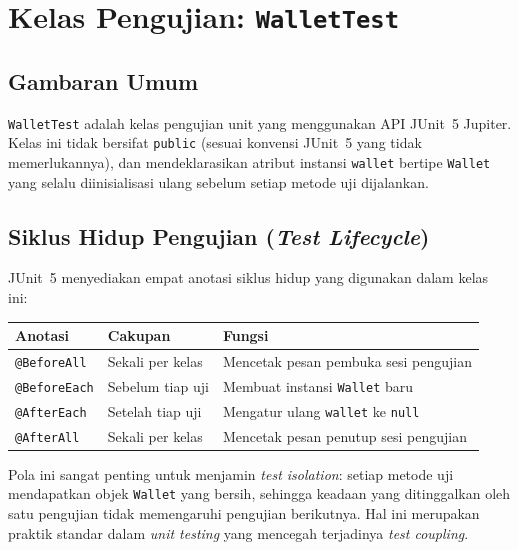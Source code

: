 \documentclass[12pt,a4paper]{article}
\begin{document}
\section{Kelas Pengujian: \texttt{WalletTest}}

\subsection{Gambaran Umum}

\texttt{WalletTest} adalah kelas pengujian unit yang menggunakan API JUnit~5 Jupiter.
Kelas ini tidak bersifat \texttt{public} (sesuai konvensi JUnit~5 yang tidak
memerlukannya), dan mendeklarasikan atribut instansi \texttt{wallet} bertipe
\texttt{Wallet} yang selalu diinisialisasi ulang sebelum setiap metode uji dijalankan.

\subsection{Siklus Hidup Pengujian (\textit{Test Lifecycle})}

JUnit~5 menyediakan empat anotasi siklus hidup yang digunakan dalam kelas ini:

\begin{center}
\begin{tabular}{lll}
\toprule
\textbf{Anotasi} & \textbf{Cakupan} & \textbf{Fungsi} \\
\midrule
\texttt{@BeforeAll}  & Sekali per kelas & Mencetak pesan pembuka sesi pengujian \\
\texttt{@BeforeEach} & Sebelum tiap uji & Membuat instansi \texttt{Wallet} baru \\
\texttt{@AfterEach}  & Setelah tiap uji & Mengatur ulang \texttt{wallet} ke \texttt{null} \\
\texttt{@AfterAll}   & Sekali per kelas & Mencetak pesan penutup sesi pengujian \\
\bottomrule
\end{tabular}
\end{center}

Pola ini sangat penting untuk menjamin \textit{test isolation}: setiap metode uji
mendapatkan objek \texttt{Wallet} yang bersih, sehingga keadaan yang ditinggalkan oleh
satu pengujian tidak memengaruhi pengujian berikutnya.  Hal ini merupakan praktik standar
dalam \textit{unit testing} yang mencegah terjadinya \textit{test coupling}.
\end{document}
